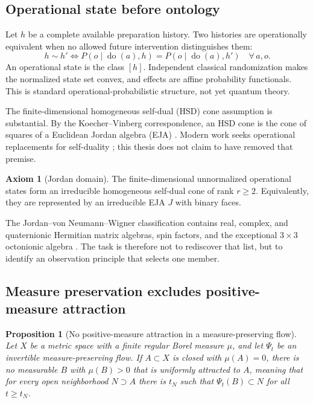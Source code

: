 \documentclass[10pt]{article}
\newtheorem{proposition}[theorem]{Proposition}
\theoremstyle{definition}
\newtheorem{axiom}[theorem]{Axiom}
\theoremstyle{remark}
\begin{document}
\subsection{Operational state before ontology}

Let \(h\) be a complete available preparation history. Two histories are operationally equivalent when no allowed future intervention distinguishes them:
\begin{equation}
  h\sim h'
  \iff
  P(o\mid\operatorname{do}(a),h)
  =
  P(o\mid\operatorname{do}(a),h')
  \quad \forall\,a,o.
  \label{eq:predictive-equivalence}
\end{equation}
An operational state is the class \([h]\). Independent classical randomization makes the normalized state set convex, and effects are affine probability functionals. This is standard operational-probabilistic structure, not yet quantum theory.

The finite-dimensional homogeneous self-dual (HSD) cone assumption is substantial. By the Koecher--Vinberg correspondence, an HSD cone is the cone of squares of a Euclidean Jordan algebra (EJA) \citep{Koecher1957,Vinberg1963,FarautKoranyi1994}. Modern work seeks operational replacements for self-duality \citep{Barnum2023}; this thesis does not claim to have removed that premise.

\begin{axiom}[Jordan domain]
\label{ax:jordan}
The finite-dimensional unnormalized operational states form an irreducible homogeneous self-dual cone of rank \(r\ge2\). Equivalently, they are represented by an irreducible EJA \(J\) with binary faces.
\end{axiom}

The Jordan--von Neumann--Wigner classification contains real, complex, and quaternionic Hermitian matrix algebras, spin factors, and the exceptional \(3\times3\) octonionic algebra \citep{Jordan1934,FarautKoranyi1994}. The task is therefore not to rediscover that list, but to identify an observation principle that selects one member.

\subsection{Measure preservation excludes positive-measure attraction}

\begin{proposition}[No positive-measure attraction in a measure-preserving flow]
\label{prop:no-attractor}
Let \(X\) be a metric space with a finite regular Borel measure \(\mu\), and let \(\Psi_t\) be an invertible measure-preserving flow. If \(A\subset X\) is closed with \(\mu(A)=0\), there is no measurable \(B\) with \(\mu(B)>0\) that is uniformly attracted to \(A\), meaning that for every open neighborhood \(N\supset A\) there is \(t_N\) such that \(\Psi_t(B)\subset N\) for all \(t\ge t_N\).
\end{proposition}
\end{document}
